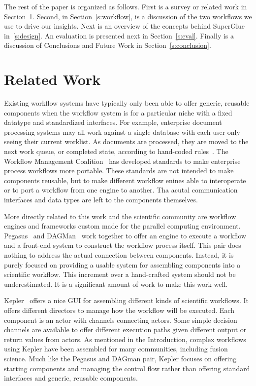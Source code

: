 \documentclass[conference]{IEEEtran}
\begin{document}
The rest of the paper is organized as follows. First is a survey or related
work in Section~\ref{s:related}. Second, in Section~\ref{s:workflow}, is a
discussion of the two workflows we use to drive our insights. Next is an
overview of the concepts behind SuperGlue in~\ref{s:design}. An evaluation is
presented next in Section~\ref{s:eval}. Finally is a discussion of Conclusions
and Future Work in Section~\ref{s:conclusion}.

\section{Related Work}
\label{s:related}

Existing workflow systems have typically only been able to offer generic,
reusable components when the workflow system is for a particular niche with a
fixed datatype and standardized interfaces. For example, enterprise document
processing systems may all work against a single database with each user only
seeing their current worklist. As documents are processed, they are moved to
the next work queue, or completed state, according to hand-coded
rules~\cite{mckesson-workflow}. The Workflow Management Coalition~\cite{wfmc}
has developed standards to make enterprise process workflows more portable.
These standards are not intended to make components reusable, but to make
different workflow enines able to interoperate or to port a workflow from one
engine to another.  Tha acutal communication interfaces and data types are left
to the components themselves.

More directly related to this work and the scientific community are workflow
engines and frameworks custom made for the parallel computing environment.
Pegasus~\cite{mullender:pegasus} and DAGMan~\cite{Malewicz:2006:dagman} work
together to offer an engine to execute a workflow and a front-end system to
construct the workflow process itself. This pair does nothing to address the
actual connection between components. Instead, it is purely focused on
providing a usable system for assembling components into a scientific workflow.
This increment over a hand-crafted system should not be underestimated. It is a
significant amount of work to make this work well.

Kepler~\cite{bertram:2006:kepler} offers a nice GUI for assembling different
kinds of scientific workflows. It offers different directors to manage how the
workflow will be executed. Each component is an actor with channels connecting
actors. Some simple decision channels are available to offer different
execution paths given different output or return values from actors. As
mentioned in the Introduction, complex workflows using Kepler have been
assembled for many communities, including fusion science. Much like the Pegasus
and DAGman pair, Kepler focuses on offering starting components and managing
the control flow rather than offering standard interfaces and generic, reusable
components.
\end{document}
